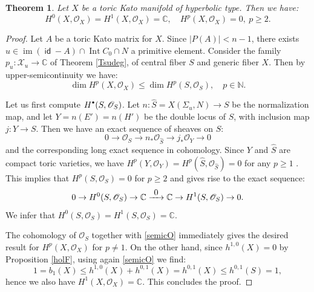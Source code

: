 \documentclass[JEP,XML,SOM,Unicode,NoFloatCountersInSection]{cedram}
\let\mathcal\mathscr
\newtheorem{theorem}{Theorem}[section]
\theoremstyle{definition}
\newcommand{\sbullet}{{\raisebox{1pt}{$\scriptscriptstyle\bullet$}}}
\newcommand{\To}[1]{\mathchoice{\xrightarrow{\textstyle\kern4pt#1\kern3pt}}{\stackrel{#1}{\longrightarrow}}{}{}}
\newcommand{\CC}{\mathbb{C}}
\newcommand{\NN}{\mathbb{N}}
\newcommand{\Oo}{\mathcal{O}}
\DeclareMathOperator{\id}{\mathsf{id}}
\DeclareMathOperator{\im}{im}
\DeclareMathOperator{\Int}{Int}
\begin{document}
\begin{theorem}\label{cohOX}
Let $X$ be a toric Kato manifold of hyperbolic type. Then we have:
\begin{equation*}
H^0(X,\Oo_X)=H^1(X,\Oo_X)=\CC, \quad H^p(X,\Oo_X)=0, \ p\geq 2.
\end{equation*}
\end{theorem}
\begin{proof}
Let $A$ be a toric Kato matrix for $X$. Since $|P(A)|<n-1$, there exists $u\in\im(\id-A)\cap \Int C_0\cap N$ a primitive element. Consider the family $p_u:\mathcal X_u\to \CC$ of Theorem \ref{Tsudeg}, of central fiber $S$ and generic fiber $X$. Then by upper-semicontinuity \cite[Th.\,4.12]{bs} we have:
\begin{equation}\label{semicO}
\dim H^p(X,\Oo_X)\leq \dim H^p(S,\Oo_S), \quad p\in\NN.
\end{equation}

Let us first compute $H^\sbullet(S,\Oo_S)$. Let $n:\hat{S}=X(\Sigma_u,N)\to S$ be the normalization map, and let $Y=n(E')=n(H')$ be the double locus of $S$, with inclusion map $j:Y\to S$. Then we have an exact sequence of sheaves on $S$:
\begin{equation}\label{normalseq}
0\to \Oo_S\to n_*\Oo_{\hat{S}} \to j_*\Oo_Y\to0
\end{equation}
and the corresponding long exact sequence in cohomology. Since $Y$ and $\hat{S}$ are compact toric varieties, we have $H^p(Y,\Oo_Y)=H^p(\hat{S},\Oo_{\hat{S}})=0$ for any $p\geq 1$ \cf \cite[Cor.\,7.4]{da}. This implies that $H^p(S,\Oo_S)=0$ for $p\geq 2$ and gives rise to the exact sequence:
\begin{equation*}
0\to H^0(S,\Oo_S)\to \CC\To0 \CC\to H^1(S,\Oo_S)\to0.
\end{equation*}
We infer that $H^0(S,\Oo_S)=H^1(S,\Oo_S)=\CC$.

The cohomology of $\Oo_S$ together with \eqref{semicO} immediately gives the desired result for $H^p(X,\Oo_X)$ for $p\neq 1$. On the other hand, since $h^{1,0}(X)=0$ by Proposition \ref{holF}, using again \eqref{semicO} we find:
\begin{equation*}
1=b_1(X)\leq h^{1,0}(X)+h^{0,1}(X)=h^{0,1}(X)\leq h^{0,1}(S)=1,
\end{equation*}
hence we also have $H^1(X,\Oo_X)=\CC$. This concludes the proof.
\end{proof}
\end{document}
